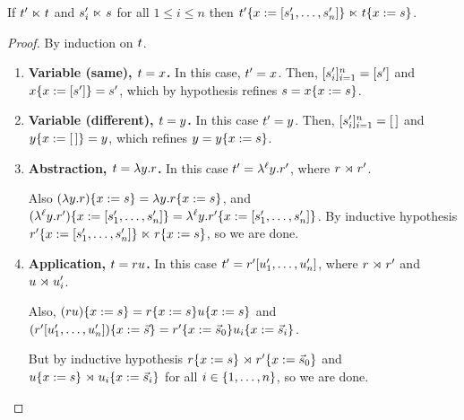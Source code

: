 
\begin{lemma}
If $t' \mathrel{\ltimes} t$ and $s'_i \mathrel{\ltimes} s$ for all $1 \leq i \leq n$
  then $t'\{x := [s_1', \hdots, s_n']\} \mathrel{\ltimes} t\{x := s\}$.
\end{lemma}
\begin{proof}
  By induction on $t$.
  \begin{enumerate}
  \item {\bf Variable (same), $t = x$.} In this case, $t' = x$.
    Then, $[s'_i]_{i=1}^{n} = [s']$
      and $x\{x := [s']\} = s'$,
      which by hypothesis refines $s = x\{x := s\}$.
  \item {\bf Variable (different), $t = y$.} In this  case $t' = y$.
    Then, $[s'_i]_{i=1}^{n} = [\,]$
      and $y\{x := [\,]\} = y$,
      which refines $y = y\{x := s\}$.
  \item {\bf Abstraction, $t = \lambda y. r$.}
    In this case $t' = \lambda^{\ell} y. r'$,
      where $r \mathrel{\rtimes} r'$.

    Also $(\lambda y. r)\{x := s\} = \lambda y. r\{x := s\}$,
    and $(\lambda^{\ell} y. r')\{x := [s_1', \hdots, s_n']\} =
         \lambda^{\ell} y. r'\{x := [s_1', \hdots, s_n']\}$.
    By inductive hypothesis $r'\{x := [s_1', \hdots, s_n']\} \mathrel{\ltimes} r\{x := s\}$,
    so we are done.
  \item {\bf Application, $t = r u$.}
    In this case $t' = r' [u'_1, \hdots, u'_n]$,
      where $r \mathrel{\rtimes} r'$
      and $u \mathrel{\rtimes} u'_i$.

    Also, $(r u)\{x := s\} =
             r\{x := s\} u\{x := s\}$
    and $(r' [u'_1, \hdots, u'_n])\{x := \vec{s}\}
           = r'\{x := \vec{s}_0\} u_i\{x := \vec{s}_i\}$.

    But by inductive hypothesis
      $r\{x := s\} \mathrel{\rtimes} r'\{x := \vec{s}_0\}$
      and $u\{x := s\} \mathrel{\rtimes} u_i\{x := \vec{s}_i\}$
        for all $i \in \{1, \hdots, n\}$,
    so we are done.
  \end{enumerate}
\end{proof}


